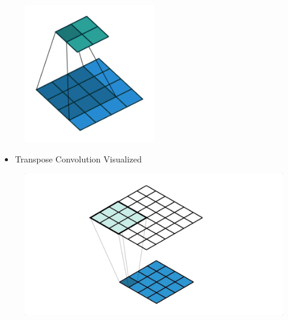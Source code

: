 \begin{figure}[H]
    \centering
    \includegraphics[width=0.5\textwidth]{.././assets/8.15.gif}
\end{figure}

\begin{itemize}
    \item Transpose Convolution Visualized
\end{itemize}

\begin{figure}[H]
    \centering
    \includegraphics[width=1.0\textwidth]{.././assets/8.16.gif}
\end{figure}

